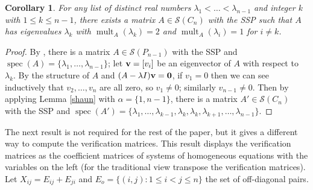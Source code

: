 \documentclass[11pt]{article}
\newtheorem{cor}[thm]{Corollary}
\theoremstyle{definition}
\theoremstyle{definition}
\theoremstyle{definition}
\DeclareMathOperator{\mult}{mult}
\newcommand{\bv}{{\bf v}}
\newcommand{\bzero}{{\bf 0}}
\newcommand{\lam}{\lambda}
\newcommand{\bpf}{\begin{proof}}
\newcommand{\epf}{\end{proof}\ms}
\newcommand{\ms}{\medskip}
\newcommand{\mptn}{\mathcal{S}} %
\def\spec{\operatorname{spec}}
\begin{document}
 
\begin{cor}\label{Cn211} For any list of distinct real numbers $\lam_1<\dots<\lam_{n-1}$ and integer $k$ with $1\le k\le n-1$,  there exists a matrix $A\in\mptn(C_n)$ with the SSP such that $A$ has eigenvalues $\lam_k$ with $\mult_A(\lam_k)=2$ and $\mult_A(\lam_i)=1$ for $i\ne k$. \end{cor}
\bpf By \cite[Remark~15]{genSAP}, there is a matrix $A\in\mptn(P_{n-1})$ with the SSP and $\spec(A)=\{\lam_1,\dots,\lam_{n-1}\}$; let $\bv=[v_i]$ be an eigenvector of $A$ with respect to $\lam_k$.    By the structure of $A$ and $(A-\lambda I)\bv=\bzero$, if $v_1=0$ then we can see inductively that $v_2,\ldots ,v_n$ are all zero, so $v_1\ne 0$;  similarly $v_{n-1}\ne0$.  Then by applying Lemma \ref{shaun} with $\alpha=\{1,n-1\}$, there is a matrix $A'\in\mptn(C_n)$ with the SSP and $\spec(A')=\{\lam_1,\dots,\lam_{k-1},\lam_k,\lam_k,\lam_{k+1},\dots,\lam_{n-1}\}$. \epf 

 
The next result  is not required for the rest of the paper, but it gives a different way to compute the verification matrices.  This result displays  the verification matrices as the coefficient matrices of systems of homogeneous equations with the variables on the left (for the traditional view transpose the verification matrices). %
Let $X_{ij}=E_{ij}+E_{ji}$ and $E_o=\{(i,j):1\leq i<j\leq n\}$ the set of off-diagonal pairs.
\end{document}
